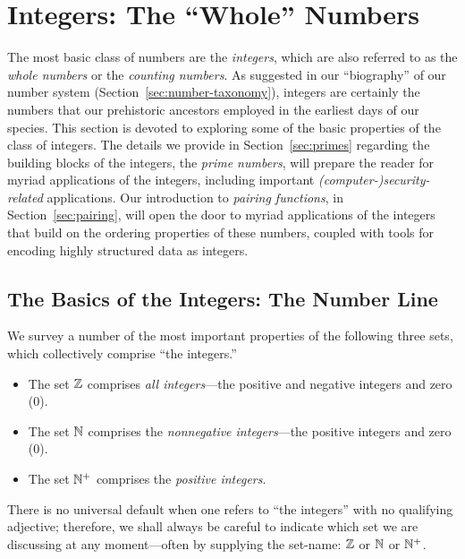 \section{Integers: The ``Whole'' Numbers}
\label{sec:integers}

The most basic class of numbers are the {\it integers},
which are also referred to as the {\it whole numbers}
or the {\em counting numbers}.
%
As suggested in our ``biography'' of our number system
(Section~\ref{sec:number-taxonomy}), integers are certainly the
numbers that our prehistoric ancestors employed in the earliest days
of our species.  This section is devoted to exploring some of the
basic properties of the class of integers.  The details we provide in
Section~\ref{sec:primes} regarding the building blocks of the
integers, the {\it prime numbers},  will prepare
the reader for myriad applications of the integers, including
important {\em (computer-)security-related} applications.  Our introduction to {\it
  pairing functions},  in
Section~\ref{sec:pairing}, will open the door to myriad
applications of the integers that build on the ordering properties of
these numbers, coupled with tools for encoding highly structured data
as integers.

\subsection{The Basics of the Integers: The Number Line}
\label{sec:integer-number-line}

We survey a number of the most important properties of the following
three sets, which collectively comprise ``the integers.''
\begin{itemize}
\item
The set $\mathbb{Z}$
comprises {\em all integers}---the positive and negative integers and
zero ($0$).
\item
The set $\mathbb{N}$
comprises the {\em nonnegative integers}---the positive integers and
zero ($0$).
\item
The set $\mathbb{N}^+$
comprises the {\em positive integers}.
\end{itemize}
There is no universal default when one refers to ``the integers'' with
no qualifying adjective; therefore, we shall always be careful to
indicate which set we are discussing at any moment---often by
supplying the set-name: $\mathbb{Z}$ or $\mathbb{N}$ or $\mathbb{N}^+$.

